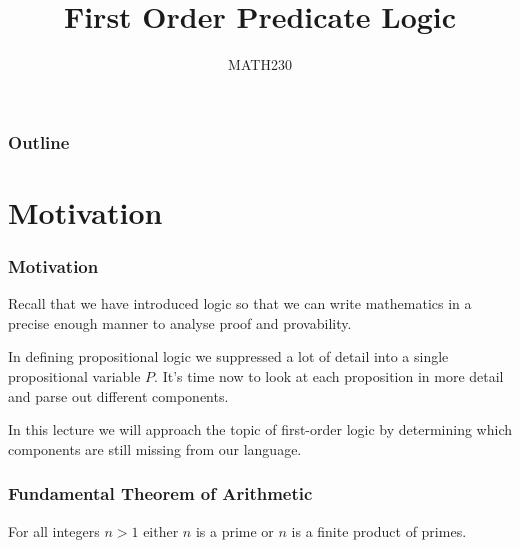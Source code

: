 \documentclass{beamer}
\title{First Order Predicate Logic}
\author{MATH230}
\institute{Te Kura P\=angarau \\ Te Whare W\=ananga o Waitaha}
\date{}
\theoremstyle{indentDefn} \newtheorem{defn}[]{Definition}
\begin{document}
\begin{frame}

  \titlepage

\end{frame}

\begin{frame}
  \frametitle{Outline}

  \tableofcontents

\end{frame}

\section{Motivation}

\begin{frame}
  \frametitle{Motivation}

  Recall that we have introduced logic so that we can write mathematics in a precise enough manner to analyse proof and provability. 
  
  \vspace{0.5cm}
  
	In defining propositional logic we suppressed a lot of detail into a single propositional variable $P$. It's time now to look at each proposition in more detail and parse out different components. 
  
  \vspace{0.5cm} 
  
  In this lecture we will approach the topic of first-order logic by determining which components are still missing from our language. 
\end{frame}


\begin{frame}
	\frametitle{Fundamental Theorem of Arithmetic}
	
	For all integers $n > 1$ either $n$ is a prime or $n$ is a finite product of primes. 
	
	\vspace{6cm}
\end{frame}
\end{document}
